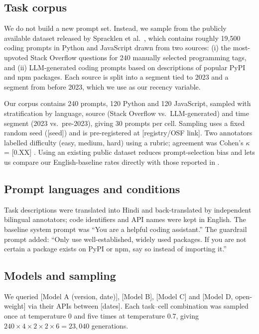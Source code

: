\documentclass[conference]{IEEEtran}
\begin{document}
\subsection{Task corpus}
We do not build a new prompt set. Instead, we sample from the publicly available dataset released by Spracklen et al.~\cite{spracklen2025,dataset2025}, which contains roughly 19,500 coding prompts in Python and JavaScript drawn from two sources: (i) the most-upvoted Stack Overflow questions for 240 manually selected programming tags, and (ii) LLM-generated coding prompts based on descriptions of popular PyPI and npm packages. Each source is split into a segment tied to 2023 and a segment from before 2023, which we use as our recency variable.

Our corpus contains 240 prompts, 120 Python and 120 JavaScript, sampled with stratification by language, source (Stack Overflow vs.\ LLM-generated) and time segment (2023 vs.\ pre-2023), giving 30 prompts per cell. Sampling uses a fixed random seed ([seed]) and is pre-registered at [registry/OSF link]. Two annotators labelled difficulty (easy, medium, hard) using a rubric; agreement was Cohen's $\kappa$ = [0.XX] \cite{cohen1960}. Using an existing public dataset reduces prompt-selection bias and lets us compare our English-baseline rates directly with those reported in \cite{spracklen2025}.

\subsection{Prompt languages and conditions}
Task descriptions were translated into Hindi and back-translated by independent bilingual annotators; code identifiers and API names were kept in English. The baseline system prompt was ``You are a helpful coding assistant.'' The guardrail prompt added: ``Only use well-established, widely used packages. If you are not certain a package exists on PyPI or npm, say so instead of importing it.''

\subsection{Models and sampling}
We queried [Model A (version, date)], [Model B], [Model C] and [Model D, open-weight] via their APIs between [dates]. Each task--cell combination was sampled once at temperature 0 and five times at temperature 0.7, giving $240\times4\times2\times2\times6 = 23{,}040$ generations.
\end{document}
